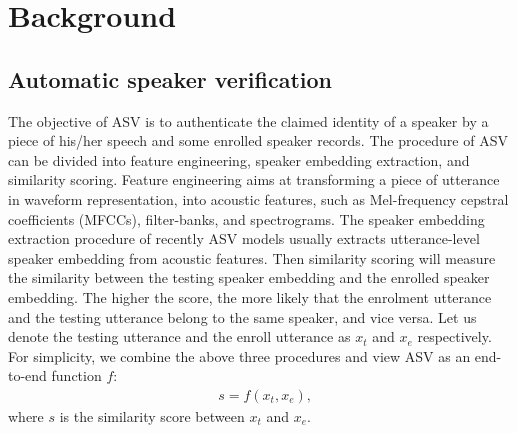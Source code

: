 \section{Background}
\subsection{Automatic speaker verification}
The objective of ASV is to authenticate the claimed identity of a speaker by a piece of his/her speech and some enrolled speaker records.
The procedure of ASV can be divided into feature engineering, speaker embedding extraction, and similarity scoring. 
Feature engineering aims at transforming a piece of utterance in waveform representation, into acoustic features, such as Mel-frequency cepstral coefficients (MFCCs), filter-banks, and spectrograms. 
The speaker embedding extraction procedure of recently ASV models \cite{dehak2010front,kenny2012small,snyder2018x} usually extracts utterance-level speaker embedding from acoustic features.
Then similarity scoring will measure the similarity between the testing speaker embedding and the enrolled speaker embedding.
The higher the score, the more likely that the enrolment utterance and the testing utterance belong to the same speaker, and vice versa. 
Let us denote the testing utterance and the enroll utterance as $x_{t}$ and $x_{e}$ respectively.
For simplicity, we combine the above three procedures and view ASV as an end-to-end function $f$: 
\begin{align}
    &s = f(x_{t}, x_{e}), 
\end{align}
where $s$ is the similarity score between $x_{t}$ and $x_{e}$.


